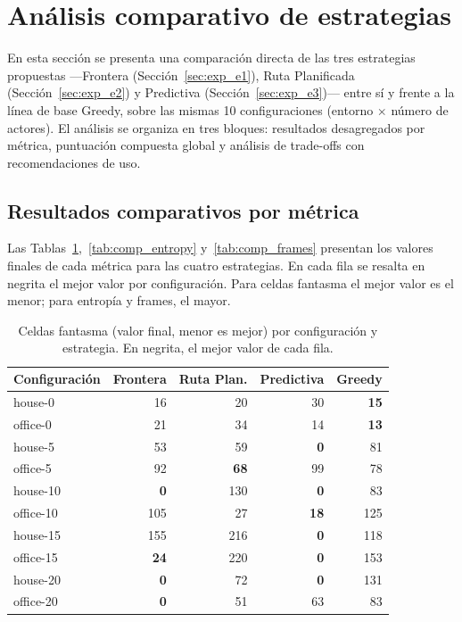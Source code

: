 \section{Análisis comparativo de estrategias}

En esta sección se presenta una comparación directa de las tres estrategias propuestas —Frontera (Sección~\ref{sec:exp_e1}), Ruta Planificada (Sección~\ref{sec:exp_e2}) y Predictiva (Sección~\ref{sec:exp_e3})— entre sí y frente a la línea de base Greedy, sobre las mismas 10 configuraciones (entorno $\times$ número de actores). El análisis se organiza en tres bloques: resultados desagregados por métrica, puntuación compuesta global y análisis de trade-offs con recomendaciones de uso.

\subsection{Resultados comparativos por métrica}

Las Tablas~\ref{tab:comp_ghost},~\ref{tab:comp_entropy} y~\ref{tab:comp_frames} presentan los valores finales de cada métrica para las cuatro estrategias. En cada fila se resalta en negrita el mejor valor por configuración. Para celdas fantasma el mejor valor es el menor; para entropía y frames, el mayor.

\begin{table}[htbp]
    \centering
    \caption{Celdas fantasma (valor final, menor es mejor) por configuración y estrategia. En negrita, el mejor valor de cada fila.}%
    \label{tab:comp_ghost}
    \begin{tabular}{lrrrr}
        \toprule
        \textbf{Configuración} & \textbf{Frontera} & \textbf{Ruta Plan.} & \textbf{Predictiva} & \textbf{Greedy} \\
        \midrule
        house-0   & 16  & 20  & 30  & \textbf{15}  \\
        office-0  & 21  & 34  & 14  & \textbf{13}  \\
        house-5   & 53  & 59  & \textbf{0}   & 81  \\
        office-5  & 92  & \textbf{68}  & 99  & 78  \\
        house-10  & \textbf{0}   & 130 & \textbf{0}   & 83  \\
        office-10 & 105 & 27  & \textbf{18}  & 125 \\
        house-15  & 155 & 216 & \textbf{0}   & 118 \\
        office-15 & \textbf{24}  & 220 & \textbf{0}   & 153 \\
        house-20  & \textbf{0}   & 72  & \textbf{0}   & 131 \\
        office-20 & \textbf{0}   & 51  & 63  & 83  \\
        \bottomrule
    \end{tabular}
\end{table}

